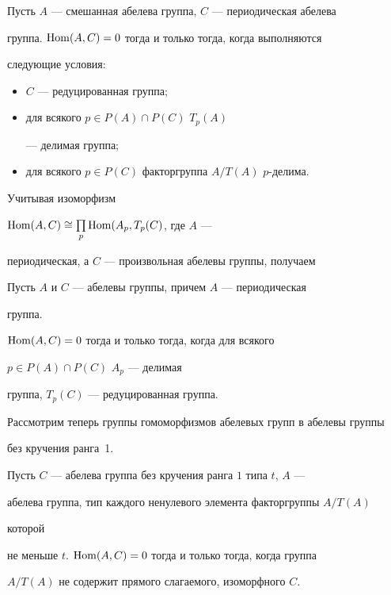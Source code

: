 \begin{cor} 


Пусть $A$ --- смешанная абелева группа, $C$ --- периодическая абелева 


группа.\; $\operatorname{Hom}(A,C)=0$ тогда и только тогда, когда выполняются 


следующие условия: 


\begin{itemize} 


\item[1)] $C$ --- редуцированная группа; 


\item[2)] для всякого $p\in P(A)\cap P(C)$\; $T_p(A)$ 


--- делимая группа; 


\item[3)] для всякого $p\in P(C)$ факторгруппа $A/T(A)$\; $p$-делима.


\end{itemize} 


\end{cor} 


 


Учитывая изоморфизм 


$\operatorname{Hom}(A,C)\cong\prod\limits_p\operatorname{Hom}(A_p,T_p(C)$, где $A$ --- 


периодическая, а $C$ --- произвольная абелевы группы, получаем 


 


\begin{cor} 


Пусть $A$ и $C$ --- абелевы группы, причем $A$ --- периодическая 


группа.\linebreak


$\operatorname{Hom}(A,C)=0$ тогда и только тогда, когда для всякого 


$p\in P(A)\cap P(C)$\; $A_p$ --- делимая 


группа, $T_p(C)$ --- редуцированная группа. 


\end{cor} 


 


Рассмотрим теперь группы гомоморфизмов абелевых групп в абелевы группы 


без кручения ранга~1. 


 


\begin{thm} 


Пусть $C$ --- абелева группа без кручения ранга $1$ типа $t$, $A$ --- 


абелева группа, тип каждого ненулевого элемента факторгруппы $A/T(A)$ 


которой 


не меньше $t$.\; $\operatorname{Hom}(A,C)=0$ тогда и только тогда, когда группа 


$A/T(A)$ не содержит прямого слагаемого, изоморфного $C$. 


\end{thm} 


